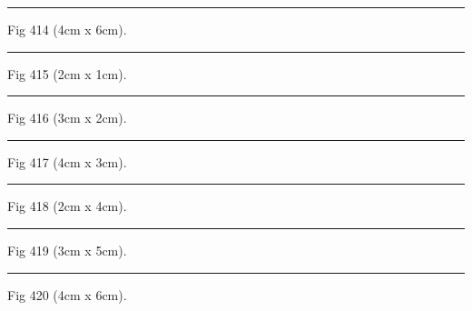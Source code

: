 \documentclass[a4paper,11pt]{article}
\begin{document}
\begin{swarmwrap}%
  \begin{minipage}[t]{4cm}
    \centering
    \rule{\linewidth}{6cm}
    {\footnotesize Fig 414 (4cm x 6cm).}
  \end{minipage}%
\end{swarmwrap}%
\swarmwrapnext
\lipsum[114]%

\begin{swarmwrap}%
  \begin{minipage}[t]{2cm}
    \centering
    \rule{\linewidth}{1cm}
    {\footnotesize Fig 415 (2cm x 1cm).}
  \end{minipage}%
\end{swarmwrap}%
\swarmwrapnext
\lipsum[115]%

\begin{swarmwrap}%
  \begin{minipage}[t]{3cm}
    \centering
    \rule{\linewidth}{2cm}
    {\footnotesize Fig 416 (3cm x 2cm).}
  \end{minipage}%
\end{swarmwrap}%
\swarmwrapnext
\lipsum[116]%

\begin{swarmwrap}%
  \begin{minipage}[t]{4cm}
    \centering
    \rule{\linewidth}{3cm}
    {\footnotesize Fig 417 (4cm x 3cm).}
  \end{minipage}%
\end{swarmwrap}%
\swarmwrapnext
\lipsum[117]%

\begin{swarmwrap}%
  \begin{minipage}[t]{2cm}
    \centering
    \rule{\linewidth}{4cm}
    {\footnotesize Fig 418 (2cm x 4cm).}
  \end{minipage}%
\end{swarmwrap}%
\swarmwrapnext
\lipsum[118]%

\begin{swarmwrap}%
  \begin{minipage}[t]{3cm}
    \centering
    \rule{\linewidth}{5cm}
    {\footnotesize Fig 419 (3cm x 5cm).}
  \end{minipage}%
\end{swarmwrap}%
\swarmwrapnext
\lipsum[119]%

\begin{swarmwrap}%
  \begin{minipage}[t]{4cm}
    \centering
    \rule{\linewidth}{6cm}
    {\footnotesize Fig 420 (4cm x 6cm).}
  \end{minipage}%
\end{swarmwrap}%
\swarmwrapnext
\lipsum[120]%
\end{document}
